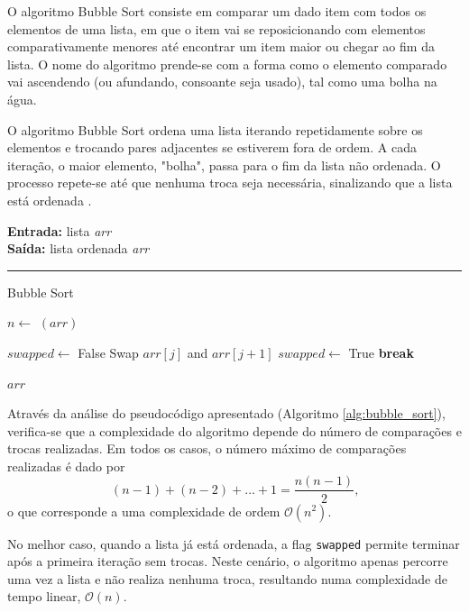 \documentclass[conference]{IEEEtran}
\begin{document}
O algoritmo Bubble Sort consiste em comparar um dado item com todos os elementos de uma lista, em que o item vai se reposicionando com elementos comparativamente menores até encontrar um item maior ou chegar ao fim da lista. O nome do algoritmo prende-se com a forma como o elemento comparado vai ascendendo (ou afundando, consoante seja usado), tal como uma bolha na água. 

O algoritmo Bubble Sort ordena uma lista iterando repetidamente sobre os elementos e trocando pares adjacentes se estiverem fora de ordem. A cada iteração, o maior elemento, "bolha", passa para o fim da lista não ordenada. O processo repete-se até que nenhuma troca seja necessária, sinalizando que a lista está ordenada \cite{asthana2016bubble}.

\begin{algorithm}[h]
    \raggedright
    \vspace{.1em}
    \textbf{Entrada:} lista \textit{arr} \\
    \textbf{Saída:} lista ordenada \textit{arr} \\
    \vspace{.5em}
    \hrule 
    \caption{Bubble Sort}
    \label{alg:bubble_sort}
    \begin{algorithmic}[1]
        \State $n \gets$ $(arr)$
        
            \State $swapped \gets$ False
                    \State Swap $arr[j]$ and $arr[j+1]$
                    \State $swapped \gets$ True
                \EndIf
            \EndFor
                \State \textbf{break}
            \EndIf
        \EndFor
    
        \State \Return $arr$
    \end{algorithmic}
\end{algorithm}

Através da análise do pseudocódigo apresentado (Algoritmo \ref{alg:bubble_sort}), verifica-se que a complexidade do algoritmo depende do número de comparações e trocas realizadas. Em todos os casos, o número máximo de comparações realizadas é dado por
\[
(n - 1) + (n - 2) + \ldots + 1 = \frac{n(n - 1)}{2} \text{,}
\]
o que corresponde a uma complexidade de ordem \(\mathcal{O}(n^2)\).

No melhor caso, quando a lista já está ordenada, a flag \texttt{swapped} permite terminar após a primeira iteração sem trocas. Neste cenário, o algoritmo apenas percorre uma vez a lista e não realiza nenhuma troca, resultando numa complexidade de tempo linear, $\mathcal{O}(n)$.
\end{document}
